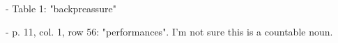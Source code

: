 \begin{enumerate}
\begin{enumerate}
 - {Table 1: "backpreassure"}

\resp {}

 - {p. 11, col. 1, row 56: "performances". I'm not sure this is a countable noun.}

\resp {}

\end{enumerate}

\end{enumerate}